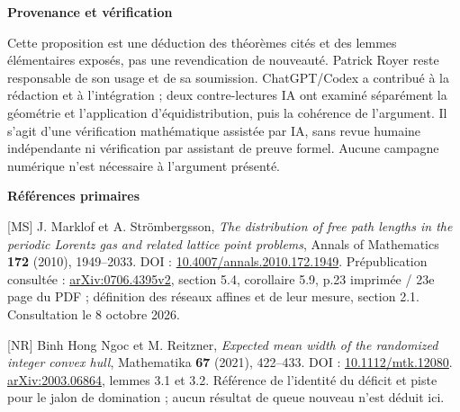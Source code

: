 \documentclass[11pt,a4paper]{article}
\newcommand{\subhead}[1]{{\bfseries\color{navy}#1}\par}
\begin{document}
\subhead{Provenance et vérification}
Cette proposition est une déduction des théorèmes cités et des lemmes élémentaires exposés, pas une revendication de nouveauté. Patrick Royer reste responsable de son usage et de sa soumission. ChatGPT/Codex a contribué à la rédaction et à l'intégration ; deux contre-lectures IA ont examiné séparément la géométrie et l'application d'équidistribution, puis la cohérence de l'argument. Il s'agit d'une vérification mathématique assistée par IA, sans revue humaine indépendante ni vérification par assistant de preuve formel. Aucune campagne numérique n'est nécessaire à l'argument présenté.

\subhead{Références primaires}
\small\raggedright
[MS] J. Marklof et A. Strömbergsson, \textit{The distribution of free path lengths in the periodic Lorentz gas and related lattice point problems}, Annals of Mathematics \textbf{172} (2010), 1949--2033. DOI : \href{https://doi.org/10.4007/annals.2010.172.1949}{10.4007/annals.2010.172.1949}. Prépublication consultée : \href{https://arxiv.org/pdf/0706.4395}{arXiv:0706.4395v2}, section 5.4, corollaire 5.9, p.23 imprimée / 23e page du PDF ; définition des réseaux affines et de leur mesure, section 2.1. Consultation le 8 octobre 2026.

[NR] Binh Hong Ngoc et M. Reitzner, \textit{Expected mean width of the randomized integer convex hull}, Mathematika \textbf{67} (2021), 422--433. DOI : \href{https://doi.org/10.1112/mtk.12080}{10.1112/mtk.12080}. \href{https://arxiv.org/abs/2003.06864}{arXiv:2003.06864}, lemmes 3.1 et 3.2. Référence de l'identité du déficit et piste pour le jalon de domination ; aucun résultat de queue nouveau n'est déduit ici.
\end{document}
